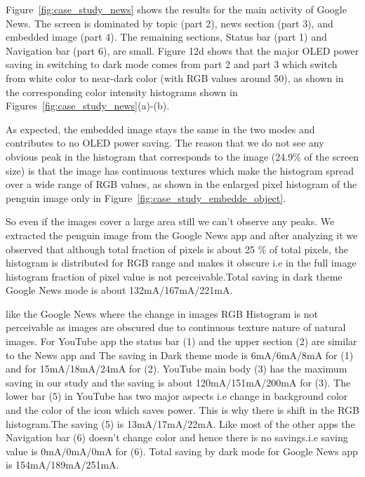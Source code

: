 Figure~\ref{fig:case_study_news} shows the results
for the main activity of Google News.  The screen is dominated by
topic (part 2), news section (part 3), and embedded image (part 4).
The remaining sections, Status bar (part 1) and Navigation bar (part
6), are small.
Figure 12d shows that the major OLED power saving in switching to dark mode comes from
part 2 and part 3 which switch from white color to near-dark color
(with RGB values around 50), as shown
in the corresponding color intensity histograms shown
in Figures~\ref{fig:case_study_news}(a)-(b).

As expected, the embedded image stays the same
in the two modes and contributes to no OLED power saving. 
The reason that we do not see any obvious peak in the histogram that corresponds to
the image (24.9\% of the screen size) is that 
the image has continuous textures which make the histogram spread over
a wide range of RGB values, as shown in the enlarged pixel histogram of
the penguin image only in Figure~\ref{fig:case_study_embedde_object}.

So even if the images cover a large area still we
can't observe any peaks. We extracted the penguin image from the Google News
app and  after analyzing it we observed that although total fraction of pixels
is about 25 \% of total pixels, the histogram is distributed for RGB range and
makes it obscure i.e in the full image histogram fraction of pixel value is not
perceivable.Total saving in dark theme Google News mode is about 132mA/167mA/221mA.
\fi


like the Google News where the change in images RGB Histogram is not
perceivable as images are obscured due to continuous texture nature of
natural images. For YouTube app the status bar (1) and the upper section (2)
are similar to the News app and The saving in Dark theme mode is
6mA/6mA/8mA for (1) and for 15mA/18mA/24mA for (2). YouTube main body (3) has
the maximum saving in our study and the saving is about 120mA/151mA/200mA for (3).
The lower bar (5) in YouTube has two major aspects i.e change in background
color and the color of the icon which saves power. This is why there is shift
in the RGB histogram.The saving (5) is  13mA/17mA/22mA. Like most of the other
apps the Navigation bar (6) doesn't change color and hence there is no
savings.i.e saving value is 0mA/0mA/0mA for (6).
Total saving by dark mode for Google News app is 154mA/189mA/251mA.
\fi

% 

